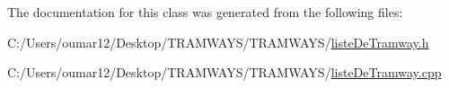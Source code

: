 The documentation for this class was generated from the following files\+:\begin{DoxyCompactItemize}
\item 
C\+:/\+Users/oumar12/\+Desktop/\+T\+R\+A\+M\+W\+A\+Y\+S/\+T\+R\+A\+M\+W\+A\+Y\+S/\hyperlink{liste_de_tramway_8h}{liste\+De\+Tramway.\+h}\item 
C\+:/\+Users/oumar12/\+Desktop/\+T\+R\+A\+M\+W\+A\+Y\+S/\+T\+R\+A\+M\+W\+A\+Y\+S/\hyperlink{liste_de_tramway_8cpp}{liste\+De\+Tramway.\+cpp}\end{DoxyCompactItemize}
